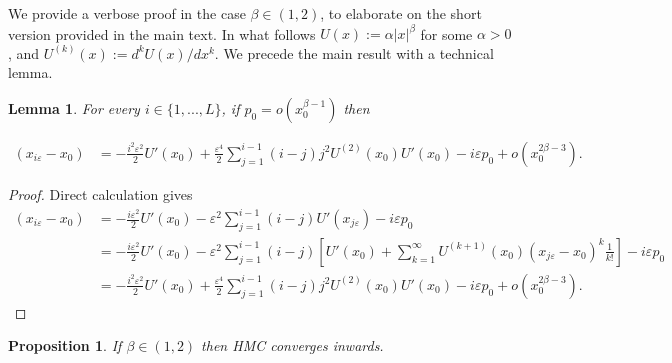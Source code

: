 \documentclass[bj,numbers,noshowframe]{imsart}
\theoremstyle{definition}
\theoremstyle{plain}
\newtheorem{prop}[defn]{Proposition}
\newtheorem{lem}[defn]{Lemma}
\theoremstyle{definition}
\begin{document}
We provide a verbose proof in the case $\beta\in(1,2)$, to elaborate on the short version provided in the main text.  In what follows $U(x):=\alpha|x|^{\beta}$ for some $\alpha>0$,
and $U^{(k)}(x):=d^{k}U(x)/dx^{k}.$ We precede the main result with
a technical lemma.
\begin{lem}
\label{lem:distance}For every $i\in\{1,...,L\}$, if $p_{0}=o(x_{0}^{\beta-1})$
then

\begin{align*}
(x_{i\varepsilon}-x_{0}) & =-\frac{i^{2}\varepsilon^{2}}{2}U'(x_{0})+\frac{\varepsilon^{4}}{2}\sum_{j=1}^{i-1}(i-j)j^{2}U^{(2)}(x_{0})U'(x_{0})-i\varepsilon p_{0}+o(x_{0}^{2\beta-3}).
\end{align*}
\end{lem}
\begin{proof}
Direct calculation gives
\begin{align*}
(x_{i\varepsilon}-x_{0}) & =-\frac{i\varepsilon^{2}}{2}U'(x_{0})-\varepsilon^{2}\sum_{j=1}^{i-1}(i-j)U'(x_{j\varepsilon})-i\varepsilon p_{0}\\
 & =-\frac{i\varepsilon^{2}}{2}U'(x_{0})-\varepsilon^{2}\sum_{j=1}^{i-1}(i-j)\left[U'(x_{0})+\sum_{k=1}^{\infty}U^{(k+1)}(x_{0})(x_{j\varepsilon}-x_{0})^{k}\frac{1}{k!}\right]-i\varepsilon p_{0}\\
 & =-\frac{i^{2}\varepsilon^{2}}{2}U'(x_{0})+\frac{\varepsilon^{4}}{2}\sum_{j=1}^{i-1}(i-j)j^{2}U^{(2)}(x_{0})U'(x_{0})-i\varepsilon p_{0}+o(x_{0}^{2\beta-3}).
\end{align*}
\end{proof}
\begin{prop}
If $\beta\in(1,2)$ then HMC converges inwards.
\end{prop}
\end{document}
